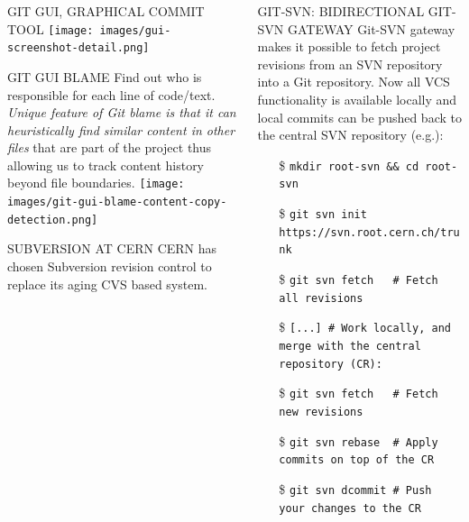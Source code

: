 \documentclass[final,hyperref={pdfpagelabels=false},notitlepage=true]{beamer}
\begin{document}
\begin{frame}{}
\begin{columns}[t]
\begin{column}{0.45\linewidth}
    \vskip2cm
    \begin{block}{\large GIT GUI, GRAPHICAL COMMIT TOOL}
    \vskip1cm
      \texttt{[image: images/gui-screenshot-detail.png]}
    \end{block}

    \vskip2cm
    \begin{block}{\large GIT GUI BLAME}
    \vskip1cm
      Find out who is responsible for each line of code/text. \emph{Unique
      feature of Git blame is that it can heuristically find similar
      content in other files} that are part of the project thus
      allowing us to track content history beyond file boundaries.
      \texttt{[image: images/git-gui-blame-content-copy-detection.png]}
    \end{block}

    \vskip2cm
    \begin{block}{\large SUBVERSION AT CERN}
    \vskip1cm
      CERN has chosen Subversion revision control to replace its aging CVS based system.
    \end{block}

    \end{column}
      \begin{column}{0.45\linewidth}

	\begin{block}{\large GIT-SVN: BIDIRECTIONAL GIT-SVN GATEWAY}
          \vskip1cm
          Git-SVN gateway makes it possible to fetch project revisions from an SVN repository into a Git 
          repository.
          \vskip1cm
          {\color{orange} Now all VCS functionality is available locally} and local commits can be pushed back to the central SVN repository (e.g.):

          \vskip1cm
          \begin{itemize}
            \item[\$] {\tt mkdir root-svn \&\& cd root-svn}
            \item[\$] {\tt git svn init https://svn.root.cern.ch/trunk}
            \item[\$] {\tt git svn fetch \ \ \# Fetch all revisions}
              \vskip1cm
            \item[\$] {\tt [...] \# Work locally, and merge with the central repository (CR):}
              \vskip1cm
            \item[\$] {\tt git svn fetch \ \ \# Fetch new revisions}
            \item[\$] {\tt git svn rebase \ \# Apply commits on top of the CR}
            \item[\$] {\tt git svn dcommit \# Push your changes to the CR}
          \end{itemize}


\end{block}
\end{column}
\end{columns}
\end{frame}
\end{document}
